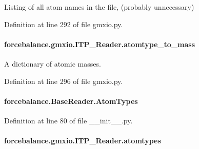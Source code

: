 Listing of all atom names in the file, (probably unnecessary) 



Definition at line 292 of file gmxio.\-py.

\hypertarget{classforcebalance_1_1gmxio_1_1ITP__Reader_ae4ae7fb78a864a7ca15f68b376e84c35}{
\paragraph[{atomtype\-\_\-to\-\_\-mass}]{\setlength{\rightskip}{0pt plus 5cm}forcebalance.\-gmxio.\-I\-T\-P\-\_\-\-Reader.\-atomtype\-\_\-to\-\_\-mass}}\label{classforcebalance_1_1gmxio_1_1ITP__Reader_ae4ae7fb78a864a7ca15f68b376e84c35}


A dictionary of atomic masses. 



Definition at line 296 of file gmxio.\-py.

\hypertarget{classforcebalance_1_1BaseReader_a69ca7d949a4a3df4d9f61e617fe0e270}{
\paragraph[{Atom\-Types}]{\setlength{\rightskip}{0pt plus 5cm}forcebalance.\-Base\-Reader.\-Atom\-Types\hspace{0.3cm}{\ttfamily [inherited]}}}\label{classforcebalance_1_1BaseReader_a69ca7d949a4a3df4d9f61e617fe0e270}


Definition at line 80 of file \-\_\-\-\_\-init\-\_\-\-\_\-.\-py.

\hypertarget{classforcebalance_1_1gmxio_1_1ITP__Reader_a771f60fa6b3020c422062bb9ceb51291}{
\paragraph[{atomtypes}]{\setlength{\rightskip}{0pt plus 5cm}forcebalance.\-gmxio.\-I\-T\-P\-\_\-\-Reader.\-atomtypes}}\label{classforcebalance_1_1gmxio_1_1ITP__Reader_a771f60fa6b3020c422062bb9ceb51291}


